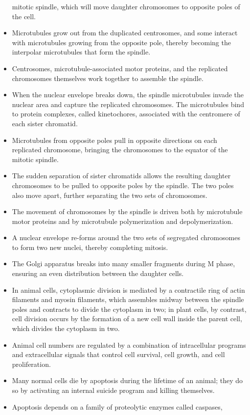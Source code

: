 \begin{itemize}
mitotic spindle, which will move daughter chromosomes
to opposite poles of the cell.
\item Microtubules grow out from the duplicated centrosomes, and some
interact with microtubules growing from the opposite pole, thereby
becoming the interpolar microtubules that form the spindle.
\item Centrosomes, microtubule-associated motor proteins, and the replicated
chromosomes themselves work together to assemble the
spindle.
\item When the nuclear envelope breaks down, the spindle microtubules
invade the nuclear area and capture the replicated chromosomes.
The microtubules bind to protein complexes, called kinetochores,
associated with the centromere of each sister chromatid.
\item Microtubules from opposite poles pull in opposite directions on each
replicated chromosome, bringing the chromosomes to the equator of
the mitotic spindle.
\item The sudden separation of sister chromatids allows the resulting
daughter chromosomes to be pulled to opposite poles by the spindle.
The two poles also move apart, further separating the two sets of
chromosomes.
\item The movement of chromosomes by the spindle is driven both by
microtubule motor proteins and by microtubule polymerization and
depolymerization.
\item A nuclear envelope re-forms around the two sets of segregated chromosomes
to form two new nuclei, thereby completing mitosis.
\item The Golgi apparatus breaks into many smaller fragments during
M phase, ensuring an even distribution between the daughter cells.
\item In animal cells, cytoplasmic division is mediated by a contractile ring
of actin filaments and myosin filaments, which assembles midway
between the spindle poles and contracts to divide the cytoplasm in
two; in plant cells, by contrast, cell division occurs by the formation
of a new cell wall inside the parent cell, which divides the cytoplasm
in two.
\item Animal cell numbers are regulated by a combination of intracellular
programs and extracellular signals that control cell survival, cell
growth, and cell proliferation.
\item Many normal cells die by apoptosis during the lifetime of an animal;
they do so by activating an internal suicide program and killing
themselves.
\item Apoptosis depends on a family of proteolytic enzymes called caspases,

\end{itemize}
